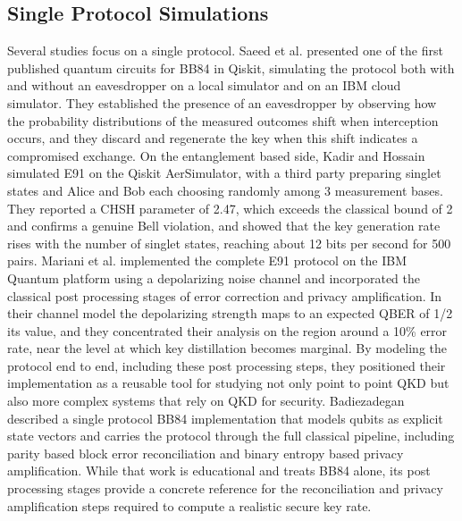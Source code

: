 \documentclass[conference]{IEEEtran}
\begin{document}
\subsection{Single Protocol Simulations}
Several studies focus on a single protocol. Saeed et al.
\cite{saeed2022implementation} presented one of the first published quantum
circuits for BB84 in Qiskit, simulating the protocol both with and without an
eavesdropper on a local simulator and on an IBM cloud simulator. They
established the presence of an eavesdropper by observing how the probability
distributions of the measured outcomes shift when interception occurs, and they
discard and regenerate the key when this shift indicates a compromised
exchange. On the entanglement based side, Kadir and Hossain \cite{kadir2025e91}
simulated E91 on the Qiskit AerSimulator, with a third party preparing singlet
states and Alice and Bob each choosing randomly among 3 measurement bases.
They reported a CHSH parameter of 2.47, which exceeds the
classical bound of 2 and confirms a genuine Bell violation, and showed that
the key generation rate rises with the number of singlet states, reaching about
12 bits per second for 500 pairs. Mariani et al. \cite{mariani2024simulation} implemented the complete E91
protocol on the IBM Quantum platform using a depolarizing noise channel and
incorporated the classical post processing stages of error correction and
privacy amplification. In their channel model the depolarizing strength maps to
an expected QBER of 1/2 its value, and they concentrated their analysis on the
region around a 10\% error rate, near the level at which key distillation
becomes marginal. By modeling the protocol end to end, including these
post processing steps, they positioned their implementation as a reusable tool
for studying not only point to point QKD but also more complex systems that
rely on QKD for security. Badiezadegan \cite{badiezadegan2026bb84} described a
single protocol BB84 implementation that models qubits as explicit state
vectors and carries the protocol through the full classical pipeline, including
parity based block error reconciliation and binary entropy based privacy
amplification. While that work is educational and treats BB84 alone, its
post processing stages provide a concrete reference for the reconciliation and
privacy amplification steps required to compute a realistic secure key rate.
\end{document}
